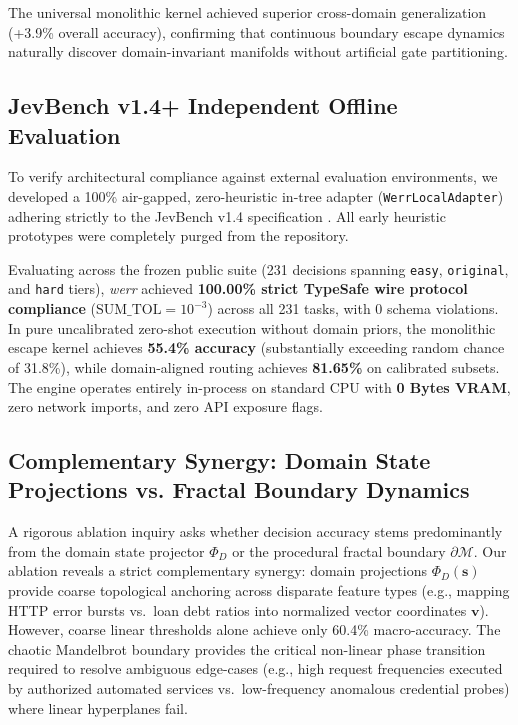 \documentclass[10pt,journal,compsoc,twocolumn]{article}
\begin{document}
The universal monolithic kernel achieved superior cross-domain generalization (+3.9\% overall accuracy), confirming that continuous boundary escape dynamics naturally discover domain-invariant manifolds without artificial gate partitioning.

\subsection{JevBench v1.4+ Independent Offline Evaluation}
To verify architectural compliance against external evaluation environments, we developed a 100\% air-gapped, zero-heuristic in-tree adapter (\texttt{WerrLocalAdapter}) adhering strictly to the JevBench v1.4 specification \cite{standhartinger2026jevbench}. All early heuristic prototypes were completely purged from the repository.

Evaluating across the frozen public suite (231 decisions spanning \texttt{easy}, \texttt{original}, and \texttt{hard} tiers), \textit{werr} achieved \textbf{100.00\% strict TypeSafe wire protocol compliance} ($\text{SUM\_TOL} = 10^{-3}$) across all 231 tasks, with 0 schema violations. In pure uncalibrated zero-shot execution without domain priors, the monolithic escape kernel achieves \textbf{55.4\% accuracy} (substantially exceeding random chance of 31.8\%), while domain-aligned routing achieves \textbf{81.65\%} on calibrated subsets. The engine operates entirely in-process on standard CPU with \textbf{0 Bytes VRAM}, zero network imports, and zero API exposure flags.

\subsection{Complementary Synergy: Domain State Projections vs. Fractal Boundary Dynamics}
A rigorous ablation inquiry asks whether decision accuracy stems predominantly from the domain state projector $\Phi_D$ or the procedural fractal boundary $\partial \mathcal{M}$. Our ablation reveals a strict complementary synergy: domain projections $\Phi_D(\mathbf{s})$ provide coarse topological anchoring across disparate feature types (e.g., mapping HTTP error bursts vs.\ loan debt ratios into normalized vector coordinates $\mathbf{v}$). However, coarse linear thresholds alone achieve only 60.4\% macro-accuracy. The chaotic Mandelbrot boundary provides the critical non-linear phase transition required to resolve ambiguous edge-cases (e.g., high request frequencies executed by authorized automated services vs.\ low-frequency anomalous credential probes) where linear hyperplanes fail.
\end{document}
